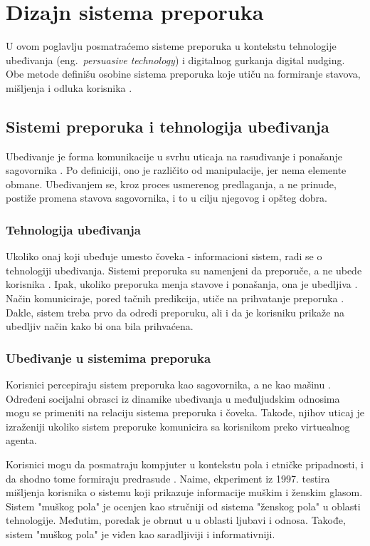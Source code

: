 
\section{Dizajn sistema preporuka}
U ovom poglavlju posmatraćemo sisteme preporuka u kontekstu tehnologije ubeđivanja (eng.~{\em persuasive technology}) i digitalnog gurkanja digital nudging. Obe metode definišu osobine sistema preporuka koje utiču na formiranje stavova, mišljenja i odluka korisnika \cite{Jesse_Jannach_2021}.

\subsection{Sistemi preporuka i tehnologija ubeđivanja}
Ubeđivanje je forma komunikacije u svrhu uticaja na rasuđivanje i ponašanje sagovornika \cite{Simons_Jones_2011}. Po definiciji, ono je različito od manipulacije, jer nema elemente obmane. Ubeđivanjem se, kroz proces usmerenog predlaganja, a ne prinude, postiže promena stavova sagovornika, i to u cilju njegovog i opšteg dobra. 

\subsubsection{Tehnologija ubeđivanja}
Ukoliko onaj koji ubeđuje umesto čoveka - informacioni sistem, radi se o tehnologiji ubeđivanja. Sistemi preporuka su namenjeni da preporuče, a ne ubede korisnika \cite{Alslaity_Tran_2019}. Ipak, ukoliko preporuka menja stavove i ponašanja, ona je ubedljiva \cite{Yoo_Gretzel_Zanker_2013}. Način komuniciraje, pored tačnih predikcija, utiče na prihvatanje preporuka \cite{Alslaity_Tran_2021}. Dakle, sistem treba prvo da odredi preporuku, ali i da je korisniku prikaže na ubedljiv način kako bi ona bila prihvaćena.

\subsubsection{Ubeđivanje u sistemima preporuka}
Korisnici percepiraju sistem preporuka kao sagovornika, a ne kao mašinu \cite{Yoo_Gretzel_Zanker_2013}. Određeni socijalni obrasci iz dinamike ubeđivanja u međuljudskim odnosima mogu se primeniti na relaciju sistema preporuka i čoveka. Takođe, njihov uticaj je izraženiji ukoliko sistem preporuke komunicira sa korisnikom preko virtuealnog agenta.

Korisnici mogu da posmatraju kompjuter u kontekstu pola i etničke pripadnosti, i da shodno tome formiraju predrasude \cite{Nass_Moon_Green_1997}. Naime, ekperiment iz 1997. testira mišljenja korisnika o sistemu koji prikazuje informacije muškim i ženskim glasom. Sistem "muškog pola" je ocenjen kao stručniji od sistema "ženskog pola" u oblasti tehnologije. Međutim, poredak je obrnut u u oblasti ljubavi i odnosa. Takođe, sistem "muškog pola" je viđen kao saradljiviji i informativniji.

